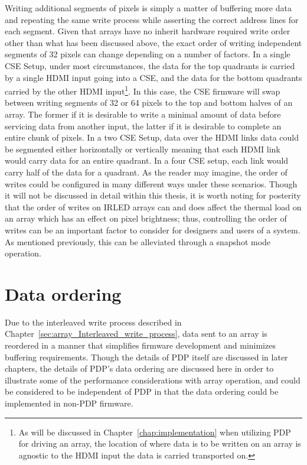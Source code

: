     Writing additional segments of pixels is simply a matter of buffering more data and repeating the same write process while asserting the correct address lines for each segment. Given that arrays have no inherit hardware required write order other than what has been discussed above, the exact order of writing independent segments of 32 pixels can change depending on a number of factors. In a single CSE Setup, under most circumstances, the data for the top quadrants is carried by a single HDMI input going into a CSE, and the data for the bottom quadrants carried by the other HDMI input\footnote{As will be discussed in Chapter~\ref{chap:implementation} when utilizing PDP for driving an array, the location of where data is to be written on an array is agnostic to the HDMI input the data is carried transported on.}. In this case, the CSE firmware will swap between writing segments of 32 or 64 pixels to the top and bottom halves of an array. The former if it is desirable to write a minimal amount of data before servicing data from another input, the latter if it is desirable to complete an entire chunk of pixels. In a two CSE Setup, data over the HDMI links data could be segmented either horizontally or vertically meaning that each HDMI link would carry data for an entire quadrant. In a four CSE setup, each link would carry half of the data for a quadrant. As the reader may imagine, the order of writes could be configured in many different ways under these scenarios. Though it will not be discussed in detail within this thesis, it is worth noting for posterity that the order of writes on IRLED arrays can and does affect the thermal load on an array which has an effect on pixel brightness\cite{BarakhshanEtAl2017, LaVeigneSieglinger2012, Norton2013}; thus, controlling the order of writes can be an important factor to consider for designers and users of a system. As mentioned previously, this can be alleviated through a snapshot mode operation.

\section{Data ordering}
    Due to the interleaved write process described in Chapter~\ref{sec:array_Interleaved_write_process}, data sent to an array is reordered in a manner that simplifies firmware development and minimizes buffering requirements. Though the details of PDP itself are discussed in later chapters, the details of PDP's data ordering are discussed here in order to illustrate some of the performance considerations with array operation, and could be considered to be independent of PDP in that the data ordering could be implemented in non-PDP firmware.

